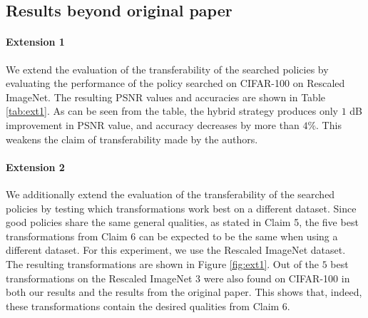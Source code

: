 \subsection{Results beyond original paper}

\paragraph{Extension 1} We extend the evaluation of the transferability of the searched policies by evaluating the performance of the policy searched on CIFAR-100 on Rescaled ImageNet. The resulting PSNR values and accuracies are shown in Table \ref{tab:ext1}. As can be seen from the table, the hybrid strategy produces only $1$ dB improvement in PSNR value, and accuracy decreases by more than $4\%$. This weakens the claim of transferability made by the authors.

\paragraph{Extension 2} We additionally extend the evaluation of the transferability of the searched policies by testing which transformations work best on a different dataset. Since good policies share the same general qualities, as stated in Claim 5, the five best transformations from Claim 6 can be expected to be the same when using a different dataset. For this experiment, we use the Rescaled ImageNet dataset. The resulting transformations are shown in Figure \ref{fig:ext1}. Out of the $5$ best transformations on the Rescaled ImageNet $3$ were also found on CIFAR-100 in both our results and the results from the original paper. This shows that, indeed, these transformations contain the desired qualities from Claim 6.

